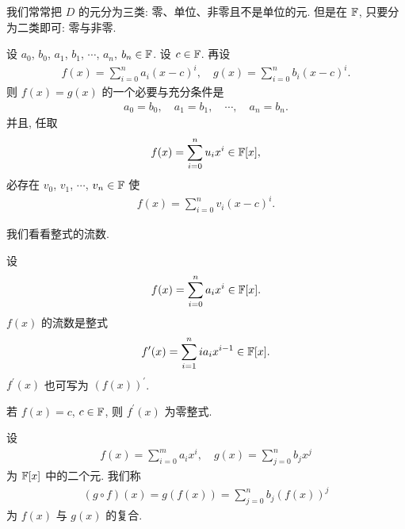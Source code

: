 \begin{remark}
    我们常常把 $D$ 的元分为三类: 零、单位、非零且不是单位的元. 但是在 $\mathbb{F}$, 只要分为二类即可: 零与非零.
\end{remark}

\begin{proposition}
    设 $a_0$, $b_0$, $a_1$, $b_1$, $\cdots$, $a_n$, $b_n \in \mathbb{F}$. 设 $c \in \mathbb{F}$. 再设
    \begin{align*}
        f(x) = \sum_{i = 0}^n a_i (x-c)^i, \quad g(x) = \sum_{i = 0}^n b_i (x-c)^i.
    \end{align*}
    则 $f(x)=g(x)$ 的一个必要与充分条件是
    \begin{align*}
        a_0 = b_0, \quad a_1 = b_1, \quad \cdots, \quad a_n = b_n.
    \end{align*}
    并且, 任取
    \begin{align*}
        f(x) = \sum_{i = 0}^n u_i x^i \in \mathbb{F}[x],
    \end{align*}
    必存在 $v_0$, $v_1$, $\cdots$, $v_n \in \mathbb{F}$ 使
    \begin{align*}
        f(x) = \sum_{i = 0}^n v_i (x-c)^i.
    \end{align*}
\end{proposition}

我们看看整式的流数.

\begin{definition}
    设
    \begin{align*}
        f(x) = \sum_{i = 0}^{n} a_i x^i \in \mathbb{F}[x].
    \end{align*}
    $f(x)$ 的流数是整式
    \begin{align*}
        f^{\prime}(x) = \sum_{i = 1}^{n} i a_i x^{i - 1} \in \mathbb{F}[x].
    \end{align*}
    $f^{\prime} (x)$ 也可写为 $(f(x))^{\prime}$.
\end{definition}

\begin{remark}
    若 $f(x) = c$, $c \in \mathbb{F}$, 则 $f^{\prime} (x)$ 为零整式.
\end{remark}

\begin{definition}
    设
    \begin{align*}
        f(x) = \sum_{i = 0}^{m} a_i x^i, \quad g(x) = \sum_{j = 0}^{n} b_j x^j
    \end{align*}
    为 $\mathbb{F}[x]$ 中的二个元. 我们称
    \begin{align*}
        (g \circ f)(x) = g(f(x)) = \sum_{j = 0}^{n} b_j (f(x))^j
    \end{align*}
    为 $f(x)$ 与 $g(x)$ 的复合.
\end{definition}

